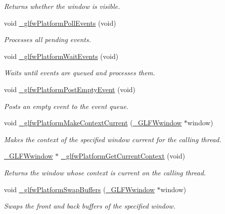 \begin{DoxyCompactItemize}
\begin{DoxyCompactList}\small\item\em Returns whether the window is visible. \end{DoxyCompactList}\item 
void \hyperlink{group__platform_ga3b129633a113e1d2bc159af038629dda}{\+\_\+glfw\+Platform\+Poll\+Events} (void)
\begin{DoxyCompactList}\small\item\em Processes all pending events. \end{DoxyCompactList}\item 
void \hyperlink{group__platform_ga2d4fd289ab03927d5856d8eb69977b9a}{\+\_\+glfw\+Platform\+Wait\+Events} (void)
\begin{DoxyCompactList}\small\item\em Waits until events are queued and processes them. \end{DoxyCompactList}\item 
void \hyperlink{group__platform_gac41dc1cf7dba6a7ce5f5903ffce9cf88}{\+\_\+glfw\+Platform\+Post\+Empty\+Event} (void)
\begin{DoxyCompactList}\small\item\em Posts an empty event to the event queue. \end{DoxyCompactList}\item 
void \hyperlink{group__platform_ga561ebc478ae1ed15b5551fafcdf3526a}{\+\_\+glfw\+Platform\+Make\+Context\+Current} (\hyperlink{struct__GLFWwindow}{\+\_\+\+G\+L\+F\+Wwindow} $\ast$window)
\begin{DoxyCompactList}\small\item\em Makes the context of the specified window current for the calling thread. \end{DoxyCompactList}\item 
\hyperlink{struct__GLFWwindow}{\+\_\+\+G\+L\+F\+Wwindow} $\ast$ \hyperlink{group__platform_ga5729dba637d75f8e80b477c01a609284}{\+\_\+glfw\+Platform\+Get\+Current\+Context} (void)
\begin{DoxyCompactList}\small\item\em Returns the window whose context is current on the calling thread. \end{DoxyCompactList}\item 
void \hyperlink{group__platform_gaed52d436a3a5510e4bd252cbf5c76302}{\+\_\+glfw\+Platform\+Swap\+Buffers} (\hyperlink{struct__GLFWwindow}{\+\_\+\+G\+L\+F\+Wwindow} $\ast$window)
\begin{DoxyCompactList}\small\item\em Swaps the front and back buffers of the specified window. \end{DoxyCompactList}\item 

\end{DoxyCompactItemize}
